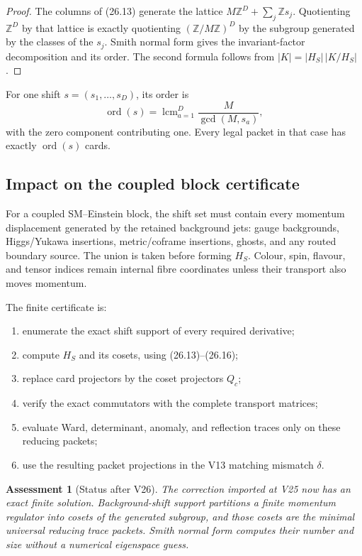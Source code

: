 \documentclass[11pt]{article}
\newtheorem{assessment}[theorem]{Assessment}
\theoremstyle{remark}
\begin{document}
\begin{proof}
The columns of (26.13) generate the lattice
\(M\mathbb Z^D+\sum_j\mathbb Zs_j\).  Quotienting
\(\mathbb Z^D\) by that lattice is exactly quotienting
\((\mathbb Z/M\mathbb Z)^D\) by the subgroup generated by the
classes of the \(s_j\).  Smith normal form gives the invariant-factor
decomposition and its order.  The second formula follows from
\(|K|=|H_S|\,|K/H_S|\).
\end{proof}

For one shift \(s=(s_1,\ldots,s_D)\), its order is
\[
 \operatorname{ord}(s)
 =
 \operatorname{lcm}_{a=1}^D
 \frac{M}{\gcd(M,s_a)},                                    \tag{26.17}
\]
with the zero component contributing one.  Every legal packet in
that case has exactly \(\operatorname{ord}(s)\) cards.

\subsection{Impact on the coupled block certificate}

For a coupled SM--Einstein block, the shift set must contain every
momentum displacement generated by the retained background jets:
gauge backgrounds, Higgs/Yukawa insertions, metric/coframe
insertions, ghosts, and any routed boundary source.  The union is
taken before forming \(H_S\).  Colour, spin, flavour, and tensor
indices remain internal fibre coordinates unless their transport
also moves momentum.

The finite certificate is:

\begin{enumerate}
\item enumerate the exact shift support of every required derivative;
\item compute \(H_S\) and its cosets, using (26.13)--(26.16);
\item replace card projectors by the coset projectors \(Q_c\);
\item verify the exact commutators with the complete transport
      matrices;
\item evaluate Ward, determinant, anomaly, and reflection traces only
      on these reducing packets;
\item use the resulting packet projections in the V13 matching
      mismatch \(\delta\).
\end{enumerate}

\begin{assessment}[Status after V26]
\label{ass:v12v26-status}
The correction imported at V25 now has an exact finite solution.
Background-shift support partitions a finite momentum regulator into
cosets of the generated subgroup, and those cosets are the minimal
universal reducing trace packets.  Smith normal form computes their
number and size without a numerical eigenspace guess.
\end{assessment}
\end{document}

